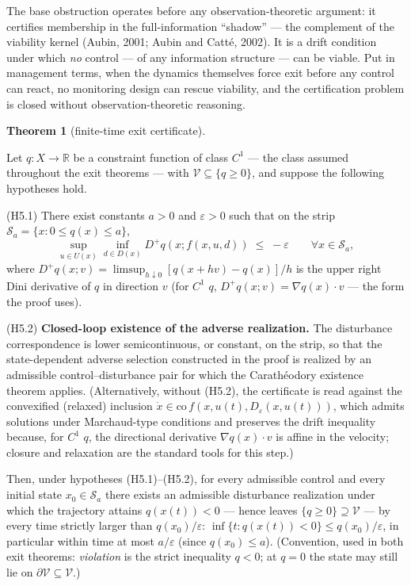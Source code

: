 \documentclass[10pt,twocolumn]{article}
\theoremstyle{definition}
\newtheorem{theorem}{Theorem}
\begin{document}
The base obstruction operates before any observation-theoretic argument: it
certifies membership in the full-information ``shadow'' --- the
complement of the viability kernel (Aubin, 2001; Aubin and
Catt\'e, 2002).
It is a drift condition under which \emph{no} control --- of any
information structure --- can be viable. Put in management terms, when the dynamics themselves force exit before any control can react, no monitoring design can rescue viability, and the certification problem is closed without observation-theoretic reasoning.

\begin{theorem}[finite-time exit certificate]\label{thm:exit}

Let \(q : X \to \mathbb{R}\) be a constraint function of class \(C^1\) --- the class assumed throughout the exit theorems --- with
\(\mathcal{V} \subseteq \{ q \ge 0 \}\), and suppose the following
hypotheses hold.

(H5.1) There exist constants \(a > 0\) and \(\varepsilon > 0\) such that
on the strip \(\mathcal{S}_a = \{ x : 0 \le q(x) \le a \}\),
\[\sup_{u \in U(x)} \inf_{d \in D(x)} D^+ q(x; f(x,u,d)) \;\le\; -\varepsilon \qquad \forall x \in \mathcal{S}_a, \tag{4}\]
where \(D^+ q(x; v) = \limsup_{h \downarrow 0} [q(x + hv) - q(x)]/h\) is
the upper right Dini derivative of \(q\) in direction \(v\) (for \(C^1\)
\(q\), \(D^+ q(x; v) = \nabla q(x) \cdot v\) --- the form the proof
uses).

(H5.2) \textbf{Closed-loop existence of the adverse realization.} The
disturbance correspondence is lower semicontinuous, or constant, on the
strip, so that the state-dependent adverse selection constructed in the
proof is realized by an admissible control--disturbance pair for which
the Carath\'eodory existence theorem applies. (Alternatively, without (H5.2), the certificate is read against the convexified (relaxed) inclusion
\(\dot x \in \mathrm{co}\, f(x, u(t), D_{\varepsilon}(x, u(t)))\), which
admits solutions under Marchaud-type conditions and preserves the drift
inequality because, for \(C^1\) \(q\), the directional derivative
\(\nabla q(x)\cdot v\) is affine in the velocity; closure and
relaxation are the standard tools for this step.)

Then, under hypotheses (H5.1)--(H5.2), for every
admissible control and every initial state \(x_0 \in \mathcal{S}_a\)
there exists an admissible disturbance realization under which the
trajectory attains \(q(x(t)) < 0\) --- hence leaves
\(\{ q \ge 0 \} \supseteq \mathcal{V}\) --- by every time strictly
larger than \(q(x_0)/\varepsilon\):
\(\inf\{ t : q(x(t)) < 0 \} \le q(x_0)/\varepsilon\), in particular
within time at most \(a/\varepsilon\) (since \(q(x_0) \le a\)).
(Convention, used in both exit theorems: \emph{violation} is the strict
inequality \(q < 0\); at \(q = 0\) the state may still lie on
\(\partial \mathcal{V} \subseteq \mathcal{V}\).)

\end{theorem}
\end{document}
